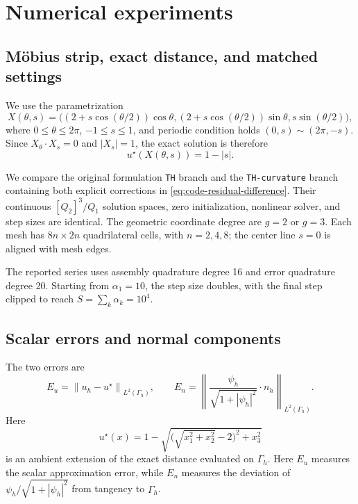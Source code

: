 \documentclass[11pt,a4paper]{article}
\newcommand{\G}{\Gamma}
\newcommand{\norm}[1]{\left\lVert#1\right\rVert}
\newcommand{\code}[1]{\texttt{#1}}
\begin{document}
\section{Numerical experiments}\label{sec:numerics}
\subsection{M\"obius strip, exact distance, and matched settings}
We use the parametrization
\begin{equation}\label{eq:mobius}
 X(\theta,s)=\big((2+s\cos(\theta/2))\cos\theta,
 (2+s\cos(\theta/2))\sin\theta,s\sin(\theta/2)\big),
\end{equation}
where $0\leq\theta\leq2\pi$, $-1\leq s\leq1$, and periodic condition holds
$(0,s)\sim(2\pi,-s)$. Since $X_\theta\cdot X_s=0$ and $|X_s|=1$,
the exact solution is therefore
\begin{equation}
 u^\star(X(\theta,s))=1-|s|.
\end{equation}

We compare the original formulation \code{TH} branch and
the \code{TH-curvature} branch containing both explicit corrections
in \eqref{eq:code-residual-difference}.
Their continuous $[Q_2]^3/Q_1$ solution spaces, zero initialization,
nonlinear solver, and step sizes are identical. The geometric
coordinate degree are $g=2$ or $g=3$. Each mesh has $8n\times2n$ quadrilateral
cells, with $n=2,4,8$; the center line $s=0$ is aligned with mesh edges.

The reported series uses assembly quadrature degree 16 and error
quadrature degree 20. Starting from $\alpha_1=10$, the step size
doubles, with the final step clipped to reach
$S=\sum_k\alpha_k=10^4$.

\subsection{Scalar errors and normal components}
The two errors are
\begin{equation}
 E_u=\norm{u_h-u^\star}_{L^2(\G_h)},\qquad
 E_n=\left\lVert
 \frac{\psi_h}{\sqrt{1+|\psi_h|^2}}\cdot n_h
 \right\rVert_{L^2(\G_h)}.
 \label{eq:numerical-errors}
\end{equation}
Here
\[
 u^\star(x)=
 1-\sqrt{\big(\sqrt{x_1^2+x_2^2}-2\big)^2+x_3^2}
\]
is an ambient extension of the exact distance evaluated on $\G_h$.
Here $E_u$ measures the scalar approximation error, while $E_n$
measures the deviation of
$\psi_h/\sqrt{1+|\psi_h|^2}$ from tangency to $\G_h$.
\end{document}

